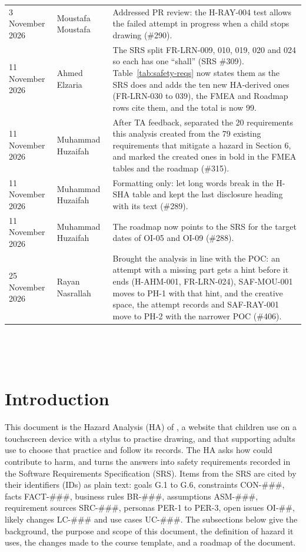 \documentclass{article}
\begin{document}
\begin{longtable}{@{}p{2.5cm}p{3.5cm}%
  >{\raggedright\arraybackslash}p{\dimexpr\textwidth-6cm-4\tabcolsep\relax}@{}}
3 November 2026 & Moustafa Moustafa & Addressed PR review: the H-RAY-004 test
allows the failed attempt in progress when a child stops drawing (\#290).\\
11 November 2026 & Ahmed Elzaria & The SRS split FR-LRN-009, 010, 019, 020 and
024 so each has one ``shall'' (SRS \#309). Table~\ref{tab:safety-reqs} now
states them as the SRS does and adds the ten new HA-derived ones (FR-LRN-030 to
039), the FMEA and Roadmap rows cite them, and the total is now 99.\\
11 November 2026 & Muhammad Huzaifah & After TA feedback, separated the 20
requirements this analysis created from the 79 existing requirements that
mitigate a hazard in Section 6, and marked the created ones in bold in the FMEA
tables and the roadmap (\#315).\\
11 November 2026 & Muhammad Huzaifah & Formatting only: let long words break in
the H-SHA table and kept the last disclosure heading with its text (\#289).\\
11 November 2026 & Muhammad Huzaifah & The roadmap now points to the SRS for
the target dates of OI-05 and OI-09 (\#288).\\
25 November 2026 & Rayan Nasrallah & Brought the analysis in line with the
POC: an attempt with a missing part gets a hint before it ends (H-AHM-001,
FR-LRN-024), SAF-MOU-001 moves to PH-1 with that hint, and the creative space,
the attempt records and SAF-RAY-001 move to PH-2 with the narrower POC
(\#406).\\
\end{longtable}

~\newpage

\tableofcontents

\listoffigures

\listoftables

~\newpage


\section{Introduction}\label{sec:intro}

This document is the Hazard Analysis (HA) of \progname{}, a website that
children use on a touchscreen device with a stylus to practise drawing, and that
supporting adults use to choose that practice and follow its records. The HA
asks how \progname{} could contribute to harm, and turns the answers into safety
requirements recorded in the Software Requirements Specification (SRS). Items
from the SRS are cited by their identifiers (IDs) as plain text: goals G.1 to
G.6, constraints CON-\#\#\#, facts FACT-\#\#\#, business rules BR-\#\#\#,
assumptions ASM-\#\#\#, requirement sources SRC-\#\#\#, personas PER-1 to PER-3,
open issues OI-\#\#, likely changes LC-\#\#\# and use cases UC-\#\#\#. The
subsections below give the background, the purpose and scope of this document,
the definition of hazard it uses, the changes made to the course template, and a
roadmap of the document.
\end{document}
